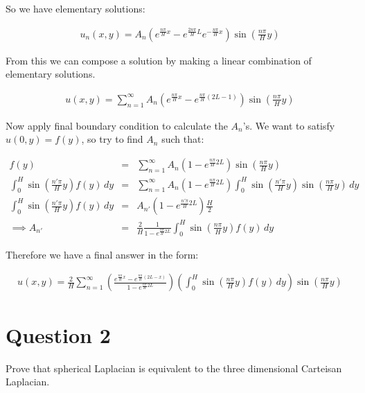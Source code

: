 \documentclass[a4paper,12pt]{article}
\begin{document}
So we have elementary solutions:

\begin{eqnarray}
u_n(x,y) = A_n\left(e^{\frac{n\pi}{H}x} - e^{\frac{2n\pi}{H}L}e^{-\frac{n\pi}{H}x}\right)\sin\left(\frac{n\pi}{H}y\right)\nonumber
\end{eqnarray}

From this we can compose a solution by making a linear combination of elementary solutions.

\begin{eqnarray}
u(x,y) = \sum_{n = 1}^{\infty}A_n\left(e^{\frac{n\pi}{H}x} - e^{\frac{n\pi}{H}(2L-1)}\right)\sin\left(\frac{n\pi}{H}y\right)\nonumber
\end{eqnarray}

Now apply final boundary condition to calculate the $A_n$'s. We want to satisfy $u(0,y) = f(y)$, so try to find $A_n$ such that:

\begin{eqnarray}
f(y) &=& \sum_{n = 1}^{\infty}A_n\left(1-e^{\frac{n\pi}{H}2L}\right)\sin\left(\frac{n\pi}{H}y\right)\nonumber\\
\int_{0}^{H}\sin\left(\frac{n'\pi}{H}y\right)f(y)\,dy &=& \sum_{n = 1}^{\infty}A_n\left(1-e^{\frac{n\pi}{H}2L}\right)\int_{0}^{H}\sin\left(\frac{n'\pi}{H}y\right)\sin\left(\frac{n\pi}{H}y\right)\,dy\nonumber\\
\int_0^H\sin\left(\frac{n'\pi}{H}y\right)f(y)\,dy &=& A_{n'}\left(1-e^{\frac{n'\pi}{H}2L}\right)\frac{H}{2}\nonumber\\
\implies A_{n'} &=& \frac{2}{H}\frac{1}{1-e^{\frac{n\pi}{H}2L}}\int_0^H\sin\left(\frac{n\pi}{H}y\right)f(y)\, dy\nonumber
\end{eqnarray}

Therefore we have a final answer in the form:

\begin{eqnarray}
u(x,y) = \frac{2}{H}\sum_{n=1}^{\infty}\left(\frac{e^{\frac{n\pi}{H}x} - e^{\frac{n\pi}{H}(2L-x)}}{1-e^{\frac{n\pi}{H}2L}}\right)\left(\int_{0}^{H}\sin\left(\frac{n\pi}{H}y\right)f(y)\,dy\right)\sin\left(\frac{n\pi}{H}y\right)\nonumber
\end{eqnarray}

\section{Question 2}

Prove that spherical Laplacian is equivalent to the three dimensional Carteisan Laplacian.
\end{document}
